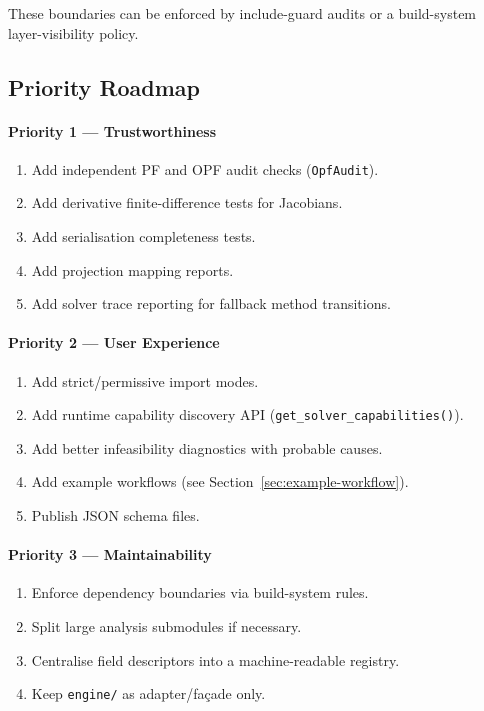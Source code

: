 These boundaries can be enforced by include-guard audits or a build-system
layer-visibility policy.

\subsection{Priority Roadmap}
\label{sec:roadmap}

\paragraph{Priority 1 --- Trustworthiness}
\begin{enumerate}
  \item Add independent PF and OPF audit checks (\texttt{OpfAudit}).
  \item Add derivative finite-difference tests for Jacobians.
  \item Add serialisation completeness tests.
  \item Add projection mapping reports.
  \item Add solver trace reporting for fallback method transitions.
\end{enumerate}

\paragraph{Priority 2 --- User Experience}
\begin{enumerate}
  \item Add strict/permissive import modes.
  \item Add runtime capability discovery API (\texttt{get\_solver\_capabilities()}).
  \item Add better infeasibility diagnostics with probable causes.
  \item Add example workflows (see Section~\ref{sec:example-workflow}).
  \item Publish JSON schema files.
\end{enumerate}

\paragraph{Priority 3 --- Maintainability}
\begin{enumerate}
  \item Enforce dependency boundaries via build-system rules.
  \item Split large analysis submodules if necessary.
  \item Centralise field descriptors into a machine-readable registry.
  \item Keep \texttt{engine/} as adapter/fa\c{c}ade only.
\end{enumerate}

